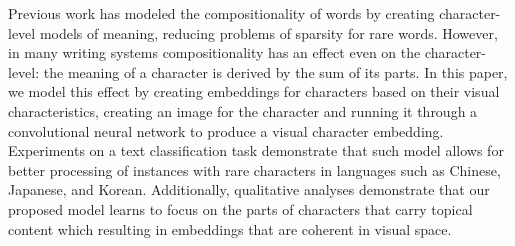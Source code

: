 Previous work has modeled the compositionality of words by creating character-level models of meaning, reducing problems of sparsity for rare words. However, in many writing systems compositionality has an effect even on the character-level: the meaning of a character is derived by the sum of its parts. In this paper, we model this effect by creating embeddings for characters based on their visual characteristics, creating an image for the character and running it through a convolutional neural network to produce a visual character embedding. Experiments on a text classification task demonstrate that such model allows for better processing of instances with rare characters in languages such as Chinese, Japanese, and Korean. Additionally, qualitative analyses demonstrate that our proposed model learns to focus on the parts of characters that carry topical content which resulting in embeddings that are coherent in visual space.
